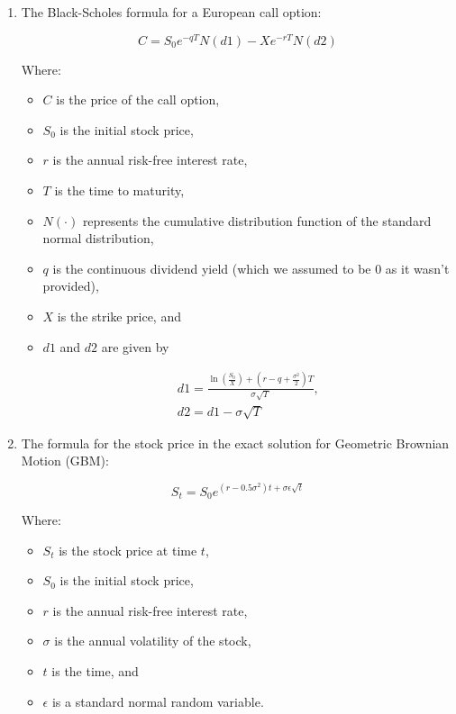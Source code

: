\documentclass{article}
\begin{document}
\begin{enumerate}
\item The Black-Scholes formula for a European call option:

\begin{equation*}
C = S_0 e^{-qT} N(d1) - X e^{-rT} N(d2)
\end{equation*}

Where:
\begin{itemize}
\item \(C\) is the price of the call option,
\item \(S_0\) is the initial stock price,
\item \(r\) is the annual risk-free interest rate,
\item \(T\) is the time to maturity,
\item \(N(\cdot)\) represents the cumulative distribution function of the standard normal distribution,
\item \(q\) is the continuous dividend yield (which we assumed to be 0 as it wasn't provided),
\item \(X\) is the strike price, and
\item \(d1\) and \(d2\) are given by

\begin{align*}
d1 = \frac{\ln \left(\frac{S_0}{X}\right) + \left(r - q + \frac{\sigma^2}{2}\right)T}{\sigma \sqrt{T}}, \\
d2 = d1 - \sigma \sqrt{T}
\end{align*}
\end{itemize}

\item The formula for the stock price in the exact solution for Geometric Brownian Motion (GBM):

\begin{equation*}
S_t = S_0 e^{(r - 0.5\sigma^2)t + \sigma\epsilon\sqrt{t}}
\end{equation*}

Where:
\begin{itemize}
\item \(S_t\) is the stock price at time \(t\),
\item \(S_0\) is the initial stock price,
\item \(r\) is the annual risk-free interest rate,
\item \(\sigma\) is the annual volatility of the stock,
\item \(t\) is the time, and
\item \(\epsilon\) is a standard normal random variable.
\end{itemize}


\end{enumerate}
\end{document}
